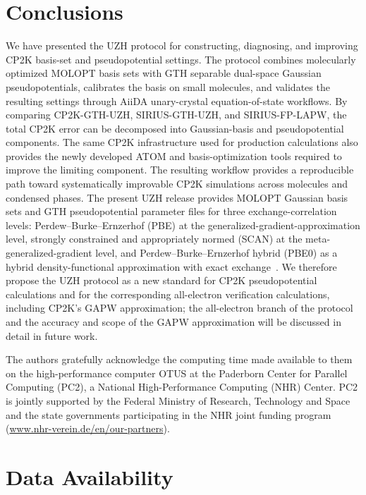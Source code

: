 \documentclass[aps,prb,reprint,amsmath,amssymb,superscriptaddress,longbibliography,floatfix]{revtex4-2}
\begin{document}
\section{Conclusions}

We have presented the UZH protocol for constructing, diagnosing, and improving CP2K basis-set and pseudopotential settings. The protocol combines molecularly optimized MOLOPT basis sets with GTH separable dual-space Gaussian pseudopotentials, calibrates the basis on small molecules, and validates the resulting settings through AiiDA unary-crystal equation-of-state workflows. By comparing CP2K-GTH-UZH, SIRIUS-GTH-UZH, and SIRIUS-FP-LAPW, the total CP2K error can be decomposed into Gaussian-basis and pseudopotential components. The same CP2K infrastructure used for production calculations also provides the newly developed ATOM and basis-optimization tools required to improve the limiting component. The resulting workflow provides a reproducible path toward systematically improvable CP2K simulations across molecules and condensed phases. The present UZH release provides MOLOPT Gaussian basis sets and GTH pseudopotential parameter files for three exchange-correlation levels: Perdew--Burke--Ernzerhof (PBE) at the generalized-gradient-approximation level, strongly constrained and appropriately normed (SCAN) at the meta-generalized-gradient level, and Perdew--Burke--Ernzerhof hybrid (PBE0) as a hybrid density-functional approximation with exact exchange~\cite{Perdew1996,Sun2016,Adamo1999}. We therefore propose the UZH protocol as a new standard for CP2K pseudopotential calculations and for the corresponding all-electron verification calculations, including CP2K's GAPW approximation; the all-electron branch of the protocol and the accuracy and scope of the GAPW approximation will be discussed in detail in future work.

\begin{acknowledgments}
The authors gratefully acknowledge the computing time made available to them on the high-performance computer OTUS at the Paderborn Center for Parallel Computing (PC2), a National High-Performance Computing (NHR) Center. PC2 is jointly supported by the Federal Ministry of Research, Technology and Space and the state governments participating in the NHR joint funding program (\url{www.nhr-verein.de/en/our-partners}).
\end{acknowledgments}

\section*{Data Availability}
\end{document}

